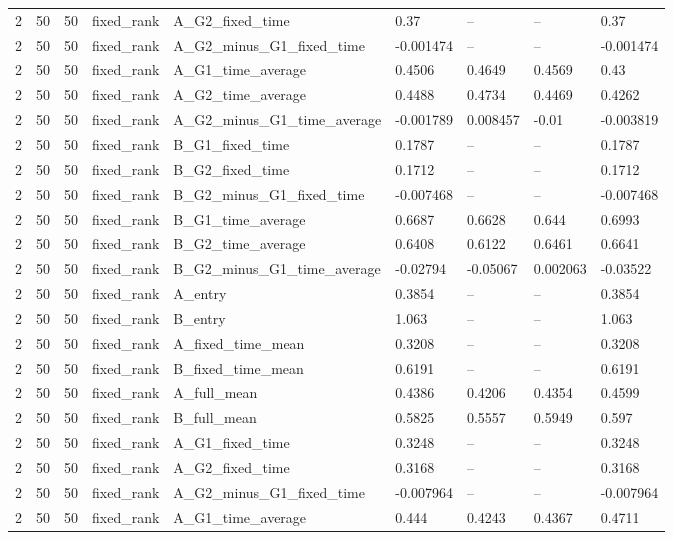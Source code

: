 \begin{longtable}{lllllllll}
2 & 50 & 50 & fixed\_rank & A\_G2\_fixed\_time & 0.37 & -- & -- & 0.37 \\
2 & 50 & 50 & fixed\_rank & A\_G2\_minus\_G1\_fixed\_time & -0.001474 & -- & -- & -0.001474 \\
2 & 50 & 50 & fixed\_rank & A\_G1\_time\_average & 0.4506 & 0.4649 & 0.4569 & 0.43 \\
2 & 50 & 50 & fixed\_rank & A\_G2\_time\_average & 0.4488 & 0.4734 & 0.4469 & 0.4262 \\
2 & 50 & 50 & fixed\_rank & A\_G2\_minus\_G1\_time\_average & -0.001789 & 0.008457 & -0.01 & -0.003819 \\
2 & 50 & 50 & fixed\_rank & B\_G1\_fixed\_time & 0.1787 & -- & -- & 0.1787 \\
2 & 50 & 50 & fixed\_rank & B\_G2\_fixed\_time & 0.1712 & -- & -- & 0.1712 \\
2 & 50 & 50 & fixed\_rank & B\_G2\_minus\_G1\_fixed\_time & -0.007468 & -- & -- & -0.007468 \\
2 & 50 & 50 & fixed\_rank & B\_G1\_time\_average & 0.6687 & 0.6628 & 0.644 & 0.6993 \\
2 & 50 & 50 & fixed\_rank & B\_G2\_time\_average & 0.6408 & 0.6122 & 0.6461 & 0.6641 \\
2 & 50 & 50 & fixed\_rank & B\_G2\_minus\_G1\_time\_average & -0.02794 & -0.05067 & 0.002063 & -0.03522 \\
2 & 50 & 50 & fixed\_rank & A\_entry & 0.3854 & -- & -- & 0.3854 \\
2 & 50 & 50 & fixed\_rank & B\_entry & 1.063 & -- & -- & 1.063 \\
2 & 50 & 50 & fixed\_rank & A\_fixed\_time\_mean & 0.3208 & -- & -- & 0.3208 \\
2 & 50 & 50 & fixed\_rank & B\_fixed\_time\_mean & 0.6191 & -- & -- & 0.6191 \\
2 & 50 & 50 & fixed\_rank & A\_full\_mean & 0.4386 & 0.4206 & 0.4354 & 0.4599 \\
2 & 50 & 50 & fixed\_rank & B\_full\_mean & 0.5825 & 0.5557 & 0.5949 & 0.597 \\
2 & 50 & 50 & fixed\_rank & A\_G1\_fixed\_time & 0.3248 & -- & -- & 0.3248 \\
2 & 50 & 50 & fixed\_rank & A\_G2\_fixed\_time & 0.3168 & -- & -- & 0.3168 \\
2 & 50 & 50 & fixed\_rank & A\_G2\_minus\_G1\_fixed\_time & -0.007964 & -- & -- & -0.007964 \\
2 & 50 & 50 & fixed\_rank & A\_G1\_time\_average & 0.444 & 0.4243 & 0.4367 & 0.4711 \\

\end{longtable}
